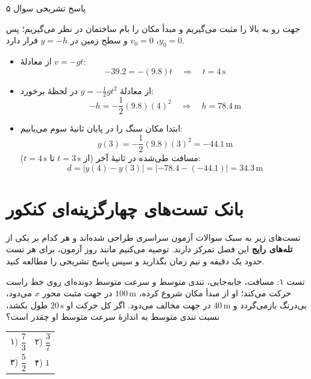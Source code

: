 \documentclass[12pt, a4paper]{article}
\begin{document}
\begin{answerbox}{پاسخ تشریحی سوال ۵}

جهت رو به بالا را مثبت می‌گیریم و مبدأ مکان را بام ساختمان در نظر می‌گیریم؛ پس $y_0 = 0$، $v_0 = 0$ و سطح زمین در $y = -h$ قرار دارد.

\begin{itemize}
    \item[الف)] از معادلهٔ $v = -gt$:
    \[
    -39.2 = -(9.8)t \quad \Longrightarrow \quad t = 4\,\text{s}
    \]

    \item[ب)] از معادلهٔ $y = -\frac{1}{2}gt^2$ در لحظهٔ برخورد:
    \[
    -h = -\frac{1}{2}(9.8)(4)^2 \quad \Longrightarrow \quad h = 78.4\,\text{m}
    \]

    \item[پ)] ابتدا مکان سنگ را در پایان ثانیهٔ سوم می‌یابیم:
    \[
    y(3) = -\frac{1}{2}(9.8)(3)^2 = -44.1\,\text{m}
    \]
    مسافت طی‌شده در ثانیهٔ آخر (از $t=3\,\text{s}$ تا $t=4\,\text{s}$):
    \[
    d = |y(4) - y(3)| = |-78.4 - (-44.1)| = 34.3\,\text{m}
    \]
\end{itemize}
\end{answerbox}

\section{بانک تست‌های چهارگزینه‌ای کنکور}

تست‌های زیر به سبک سوالات آزمون سراسری طراحی شده‌اند و هر کدام بر یکی از \textbf{تله‌های رایج} این فصل تمرکز دارند. توصیه می‌کنیم مانند روز آزمون، برای هر تست حدود یک دقیقه و نیم زمان بگذارید و سپس پاسخ تشریحی را مطالعه کنید.

\begin{exambox}{تست ۱: مسافت، جابه‌جایی، تندی متوسط و سرعت متوسط}
دونده‌ای روی خط راست حرکت می‌کند؛ او از مبدأ مکان شروع کرده، $100\,\text{m}$ در جهت مثبت محور $x$ می‌دود، بی‌درنگ بازمی‌گردد و $40\,\text{m}$ در جهت مخالف می‌دود. اگر کل حرکت او $20\,\text{s}$ طول بکشد، نسبت تندی متوسط به اندازهٔ سرعت متوسط او چقدر است؟

\begin{center}
\begin{tabular}{p{7cm} p{7cm}}
۱) $\dfrac{7}{3}$ & ۲) $\dfrac{3}{7}$ \\[0.35cm]
۳) $\dfrac{5}{2}$ & ۴) $1$ \\
\end{tabular}
\end{center}
\end{exambox}
\end{document}
